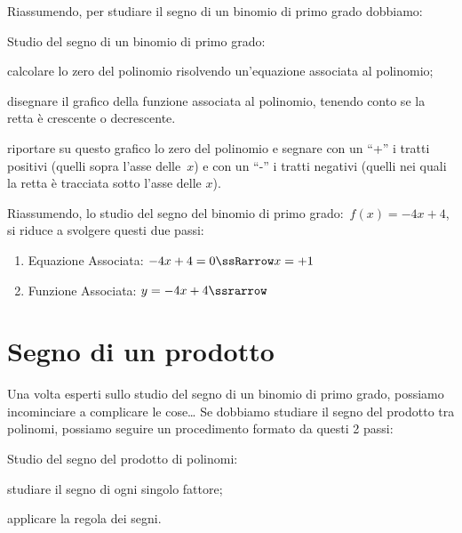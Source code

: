 
Riassumendo, per studiare il segno di un binomio di primo grado dobbiamo: 

\begin{procedura}{}{}
Studio del segno di un binomio di primo grado:
\begin{enumeratea}
\item calcolare lo zero del polinomio risolvendo un'equazione associata al 
polinomio;
\item disegnare il grafico della funzione associata al polinomio, 
tenendo conto se la retta è crescente o decrescente.
\item riportare su questo grafico lo zero del polinomio e segnare con un 
``+'' i tratti positivi (quelli sopra l'asse delle~\(x\)) e con un ``-'' i 
tratti  negativi (quelli nei quali la retta è tracciata sotto l'asse 
delle \(x\)).
\end{enumeratea}
\end{procedura}
Riassumendo, lo studio del segno del binomio di primo 
grado:~\(f(x) = -4 x +4\), si riduce a svolgere questi due passi:

\begin{enumerate}
\item Equazione Associata: \quad \(-4 x +4 = 0 \ssRarrow x = +1\) \\[-8mm]
\item Funzione Associata: \quad \(y = -4 x +4 \ssrarrow\)
\end{enumerate}

\section{Segno di un prodotto}
\label{sec:dis_prodotto}
Una volta esperti sullo studio del segno di un binomio di primo grado, possiamo
incominciare a complicare le cose\dots
Se dobbiamo studiare il segno del prodotto tra polinomi, possiamo 
seguire un procedimento formato da questi 2 passi:

\begin{procedura}{}{}
 Studio del segno del prodotto di polinomi:
\begin{enumeratea}
\item studiare il segno di ogni singolo fattore;
\item applicare la regola dei segni.
\end{enumeratea}
\end{procedura}

